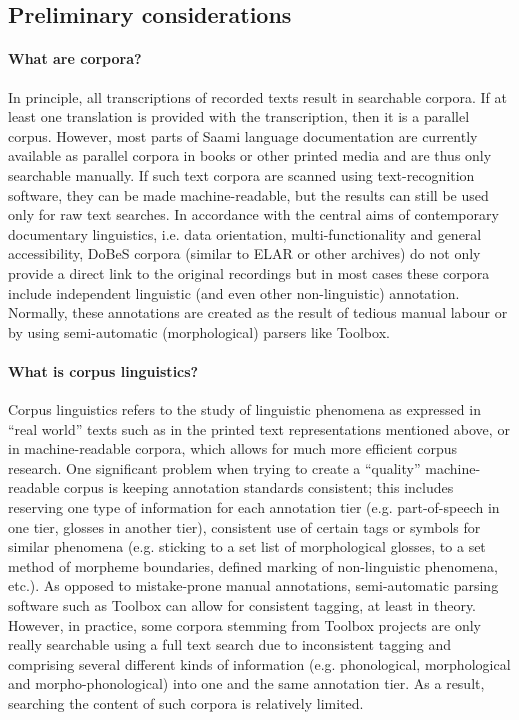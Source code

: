 \documentclass[a4paper,12pt]{article}
\begin{document}
\subsection{Preliminary considerations}%
\paragraph{What are corpora?} In principle, all transcriptions of recorded texts result in searchable corpora. If at least one translation is provided with the transcription, then it is a parallel corpus. However, most parts of Saami language documentation are currently available as parallel corpora in books or other printed media and are thus only searchable manually. If such text corpora are scanned using text-recognition software, they can be made machine-readable, but the results can still be used only for raw text searches. In accordance with the central aims of contemporary documentary linguistics, i.e. data orientation, multi-functionality and general accessibility, DoBeS corpora (similar to ELAR or other archives) do not only provide a direct link to the original recordings but in most cases these corpora include independent linguistic (and even other non-linguistic) annotation. Normally, these annotations are created as the result of tedious manual labour or by using semi-automatic (morphological) parsers like Toolbox.

\paragraph{What is corpus linguistics?} Corpus linguistics refers to the study of linguistic phenomena as expressed in “real world” texts such as in the printed text representations mentioned above, or in machine-readable corpora, which allows for much more efficient corpus research. One significant problem when trying to create a “quality” machine-readable corpus is keeping annotation standards consistent; this includes reserving one type of information for each annotation tier (e.g. part-of-speech in one tier, glosses in another tier), consistent use of certain tags or symbols for similar phenomena (e.g. sticking to a set list of morphological glosses, to a set method of morpheme boundaries, defined marking of non-linguistic phenomena, etc.). As opposed to mistake-prone manual annotations, semi-automatic parsing software such as Toolbox can allow for consistent tagging, at least in theory. However, in practice, some corpora stemming from Toolbox projects are only really searchable using a full text search due to inconsistent tagging and comprising several different kinds of information (e.g. phonological, morphological and morpho-phonological) into one and the same annotation tier. As a result, searching the content of such corpora is relatively limited.
\end{document}
